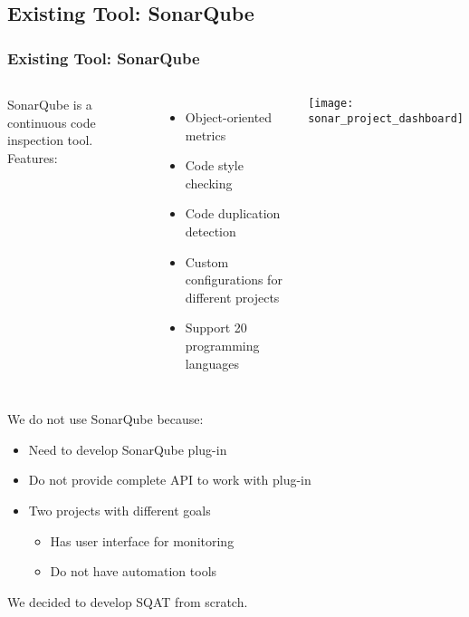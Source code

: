 \subsection{Existing Tool: SonarQube}
\begin{frame}[allowframebreaks]
\frametitle{Existing Tool: SonarQube}

\begin{columns}
SonarQube is a continuous code inspection tool. Features:
\begin{itemize}
  \item Object-oriented metrics
  \item Code style checking
  \item Code duplication detection
  \item Custom configurations for different projects
  \item Support 20 programming languages
\end{itemize}
\texttt{[image: sonar\_project\_dashboard]}
\end{columns}

\framebreak

We do not use SonarQube because:
\begin{itemize}
  \item Need to develop SonarQube plug-in
  \item Do not provide complete API to work with plug-in
    \item Two projects with different goals
  \begin{itemize}
    \item Has user interface for monitoring
    \item Do not have automation tools
  \end{itemize}
\end{itemize}

We decided to develop SQAT from scratch.

\end{frame}